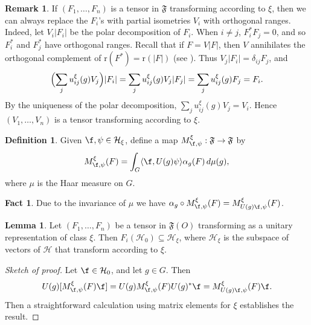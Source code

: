 \documentclass[12pt]{article}
\theoremstyle{definition}
\newtheorem{fact}[thm]{Fact}
\newtheorem{lemma}[thm]{Lemma}
\theoremstyle{definition}
\newtheorem{defn}[thm]{Definition}
\newtheorem{note}[thm]{Remark}
\theoremstyle{remark}
\def\2#1{{\mathcal #1}}
\def\al#1{{\mathfrak #1}}
\def\a{\alpha} \def\b{\beta} \def\g{\gamma} \def\d{\delta}
\begin{document}
\begin{note} If $(F_1,\dots ,F_n)$ is a tensor in $\al F$ transforming
  according to $\xi$, then we can always replace the $F_i$'s with
  partial isometries $V_i$ with orthogonal ranges.  Indeed, let
  $V_i|F_i|$ be the polar decomposition of $F_i$.  When $i\neq j$,
  $F_i^*F_j=0$, and so $F^{*}_i$ and $F^*_j$ have orthogonal ranges.
  Recall that if $F=V|F|$, then $V$ annihilates the orthogonal
  complement of $\mathrm{r}(F^*)=\mathrm{r}(|F|)$ (see \cite[Thm.\
  6.1.2]{kr}).  Thus $V_j|F_i|=\d _{ij}F_j$, and $$ \Bigl( \sum
  _ju^{\xi}_{ij}(g)V_j \Bigr) |F_i| = \sum
  _{j}u^{\xi}_{ij}(g)V_{j}|F_j| = \sum _ju^{\xi}_{ij}(g)F_j =
  F_i .$$ By the uniqueness of the polar decomposition, $\sum
  _{j}u^{\xi}_{ij}(g)V_{j}=V_i$.  Hence $(V_1,\dots ,V_n)$ is a
  tensor transforming according to $\xi$.
\end{note}

\begin{defn} Given $\f ,\psi \in \2H _{\xi}$, define a map
  $M^{\xi}_{\f ,\psi}:\al F\to \al F$ by
$$ M^{\xi}_{\f,\psi }(F) =\int _G\langle \f ,U(g)\psi \rangle \a _g(F)
\,d\mu (g) ,$$ where $\mu$ is the Haar measure on $G$.
\end{defn}

\begin{fact} Due to the invariance of $\mu$ we have
  $\a _g \circ M^{\xi}_{\f ,\psi}(F)=M^{\xi}_{U(g)\f ,\psi
  }(F)$.  \end{fact}


\begin{lemma} Let $(F_1,\dots ,F_n)$ be a tensor in $\al F (O)$
  transforming as a unitary representation of class $\xi$.  Then
  $F_i(\2H _0)\subseteq \2H _{\xi}$, where $\2H _{\xi}$ is the
  subspace of vectors of $\2H$ that transform according to $\xi$.
  \label{crash}
\end{lemma}

\begin{proof}[Sketch of proof] Let $\f \in \2H _0$, and let $g\in G$.
  Then
  \begin{eqnarray*} U(g)[M^{\xi}_{\f ,\psi}(F)\f] = U(g)M^{\xi}_{\f
      ,\psi}(F)U(g)^*\f = M^{\xi}_{U(g)\f ,\psi}(F)\f
    . \end{eqnarray*} Then a straightforward calculation using matrix
  elements for $\xi$ establishes the result.
\end{proof}
\end{document}
